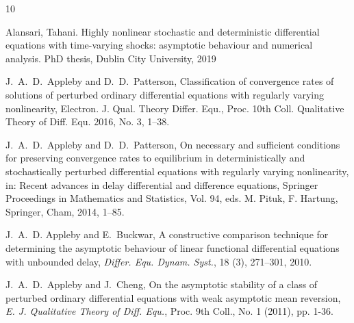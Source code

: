 \documentclass[a4paper,10pt,reqno]{amsart}
\numberwithin{equation}{section}
\theoremstyle{definition}
\theoremstyle{remark}
\DeclareMathOperator{\1}{\mathbbm 1}
\begin{document}
	
	\begin{thebibliography}{10}
		
		Alansari, Tahani. Highly nonlinear stochastic and deterministic differential equations with time-varying shocks: asymptotic behaviour and numerical analysis. PhD thesis, Dublin City University, 2019
		
		
		
		
		J.~A.~D.~Appleby and D.~D.~Patterson, Classification of convergence rates of solutions of perturbed ordinary differential equations with regularly 
		varying nonlinearity, Electron. J. Qual. Theory Differ. Equ., Proc. 10th Coll. Qualitative Theory of Diff. Equ. 2016, No. 3, 1--38.
		
		J.~A.~D.~Appleby and D.~D.~Patterson, On necessary and sufficient conditions for preserving
		convergence rates to equilibrium in deterministically and stochastically perturbed differential equations with regularly varying nonlinearity, in: Recent advances in delay differential
		and difference equations, Springer Proceedings in Mathematics and Statistics, Vol. 94, eds.
		M. Pituk, F. Hartung, Springer, Cham, 2014, 1--85. 
		
		J.~A.~D. Appleby and E.~Buckwar, A constructive comparison technique for determining the asymptotic behaviour of linear functional differential equations with unbounded delay, \emph{Differ. Equ. Dynam. Syst.}, 18 (3), 271--301, 2010.
		
		J.~A.~D.~Appleby and J.~Cheng, On the asymptotic stability of a
		class of perturbed ordinary differential equations with weak
		asymptotic mean reversion, \emph{E. J. Qualitative Theory of Diff.
			Equ.}, Proc. 9th Coll., No. 1 (2011), pp. 1-36.
		

\end{thebibliography}
\end{document}
